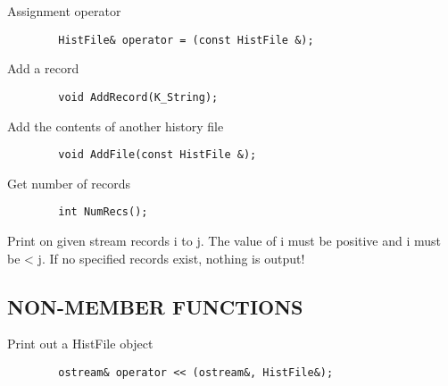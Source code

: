            Assignment operator
\begin{verbatim}
        HistFile& operator = (const HistFile &);
\end{verbatim}

           Add a record
\begin{verbatim}
        void AddRecord(K_String);
\end{verbatim}

           Add the contents of another history file
\begin{verbatim}
        void AddFile(const HistFile &);
\end{verbatim}

           Get number of records
\begin{verbatim}
        int NumRecs();
\end{verbatim}

           Print on given stream records i to j. The value of i must be
           positive and i must be < j. If no specified records exist,
           nothing is output!

\subsection*{NON-MEMBER FUNCTIONS}

           Print out a HistFile object
\begin{verbatim}
        ostream& operator << (ostream&, HistFile&);
\end{verbatim}

